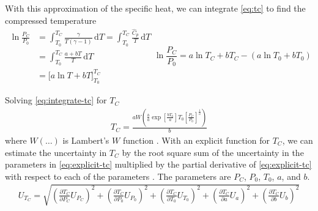 \documentclass[../main.tex]{subfiles}
\begin{document}
With this approximation of the specific heat, we can integrate \autoref{eq:tc}
to find the compressed temperature
%
\begin{subequations}
\begin{align}
\ln{\frac{P_C}{P_0}} &= \int_{T_0}^{T_{C}} \! \frac{\gamma}{T\left(\gamma-1\right)} \, \mathrm{d} T
                      = \int_{T_0}^{T_{C}} \! \frac{\hat{C}_p}{T} \, \mathrm{d} T \\
&= \int_{T_0}^{T_{C}} \! \frac{a + b T}{T} \, \mathrm{d} T\\
&= \Big[a \ln{T} + b T \Big]_{T_0}^{T_C}
\end{align}
\begin{equation}
\ln{\frac{P_C}{P_0}} = a \ln{T_C} + b T_C - \left(a \ln{T_0} + b T_0\right) \label{eq:integrate-tc}
\end{equation}
\end{subequations}

Solving \autoref{eq:integrate-tc} for $T_C$
%
\begin{align}
\label{eq:explicit-tc}
T_C = \frac{a W\!\left(\frac{b}{a} \exp\!{\left[\frac{b T_0}{a}\right]} T_0 \left[\frac{P_C}{P_0}\right]^{\frac{1}{a}}\right)}{b}
\end{align}
%
where $W(\ldots)$ is Lambert's $W$ function \cite{Corless1996}. With an explicit function for $T_C$, we can
estimate the uncertainty in $T_C$ by the root square sum of the uncertainty in the parameters in
\autoref{eq:explicit-tc} multiplied by the partial derivative of \autoref{eq:explicit-tc} with
respect to each of the parameters \cite{Taylor1982}. The parameters are $P_C$, $P_0$, $T_0$, $a$, and $b$.
%
\begin{align}
\label{eq:tc-unc}
U_{T_C} = \sqrt{\left(\frac{\partial T_C}{\partial P_C} U_{P_C}\right)^2 + \left(\frac{\partial T_C}{\partial P_0} U_{P_0}\right)^2 +
                \left(\frac{\partial T_C}{\partial T_0} U_{T_0}\right)^2 + \left(\frac{\partial T_C}{\partial a} U_{a}\right)^2 +
                \left(\frac{\partial T_C}{\partial b} U_{b}\right)^2}
\end{align}
\end{document}
